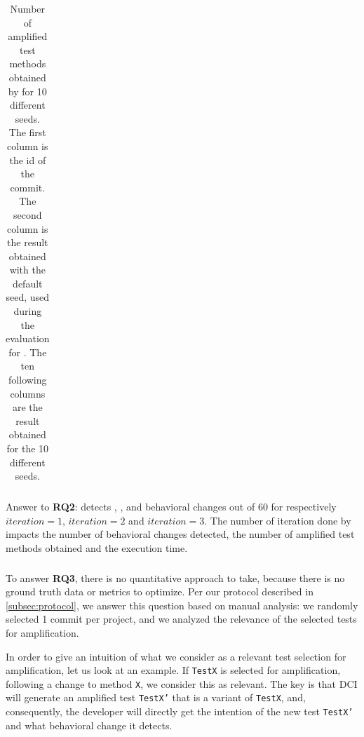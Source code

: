 \begin{table}
\small
\def\arraystretch{.5}%
\setlength\tabcolsep{3pt} %
\caption{Number of amplified test methods obtained by \DCI for 10 different seeds. The first column is the id of the commit. The second column is the result obtained with the default seed, used during the evaluation for \rqdetection. The ten following columns are the result obtained for the 10 different seeds.}
\label{tab:overall_result_seeds}
\begin{tabular}{l|c|llllllllll}

\end{tabular}
\end{table}

\begin{mdframed}
Answer to \textbf{RQ2}: \DCII detects  , , and  behavioral changes out of 60 for respectively $iteration=1$, $iteration=2$ and $iteration=3$.
The number of iteration done by \DCII impacts the number of behavioral changes detected, the number of amplified test methods obtained and the execution time.
\end{mdframed}


\subsubsection{\rqselection}
\label{subsec:dci:evaluation:rq3}

To answer \textbf{RQ3}, there is no quantitative approach to take, because there is no ground truth data or metrics to optimize. 
Per our protocol described in \autoref{subsec:protocol}, we answer this question based on manual analysis:
we randomly selected 1 commit per project, and we analyzed the relevance of the selected tests for amplification.

In order to give an intuition of what we consider as a relevant test selection for amplification, let us look at an example. 
If \texttt{TestX} is selected for amplification, following a change to method \texttt{X}, we consider this as relevant. The key is that DCI will generate an amplified test \texttt{TestX'} that is a variant of \texttt{TestX}, and, consequently, the developer will directly get the intention of the new test \texttt{TestX'} and what behavioral change it detects.

